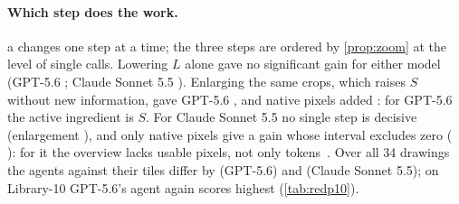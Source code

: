 \begin{table}[t]
\centering
\small
\setlength{\tabcolsep}{3pt}
\caption{Who splits, on the same model and with the same reasoning setting (GPT-5.6: medium effort; Claude Sonnet 5.5: adaptive thinking; Gemini 3.8: dynamic thinking). Caller's tiles: the 44 px recipe and its fixed-grid counterpart, which zoom out on one of the 14 sheets for GPT-5.6 and Claude Sonnet 5.5 and on none for Gemini 3.8. Tokens: mean input tokens per LegendSpot test drawing. Qwen3-VL, which has no reasoning mode, reaches \XqD{} F1 with tiles and \XqAgF{} as an agent over all 34 drawings.}
\label{tab:whosplits}
\end{table}

\paragraph{Which step does the work.} a changes one step at a time; the three steps are ordered by \cref{prop:zoom} at the level of single calls. Lowering $L$ alone gave no significant gain for either model (GPT-5.6 \XnHThreegptFiveSixOVCAOneR{} \XnHThreegptFiveSixOVCAOneRCI; Claude Sonnet 5.5 \XnHThreesonnetFiveFiveOVCAOneR{} \XnHThreesonnetFiveFiveOVCAOneRCI). Enlarging the same crops, which raises $S$ without new information, gave GPT-5.6 \XnHThreegptFiveSixOVZOVC{} \XnHThreegptFiveSixOVZOVCCI, and native pixels added \XnHThreegptFiveSixAGOVZ{} \XnHThreegptFiveSixAGOVZCI: for GPT-5.6 the active ingredient is $S$. For Claude Sonnet 5.5 no single step is decisive (enlargement \XnHThreesonnetFiveFiveOVZOVC{} \XnHThreesonnetFiveFiveOVZOVCCI), and only native pixels give a gain whose interval excludes zero (\XnHThreesonnetFiveFiveAGOVZ{} \XnHThreesonnetFiveFiveAGOVZCI): for it the overview lacks usable pixels, not only tokens~\cite{xu2020usable}. Over all 34 drawings the agents against their tiles differ by \XnAGDRallgptFiveSix{} \XnAGDRallgptFiveSixCI{} (GPT-5.6) and \XnAGDRallsonnetFiveFive{} \XnAGDRallsonnetFiveFiveCI{} (Claude Sonnet 5.5); on Library-10 GPT-5.6's agent again scores highest (\cref{tab:redp10}).

